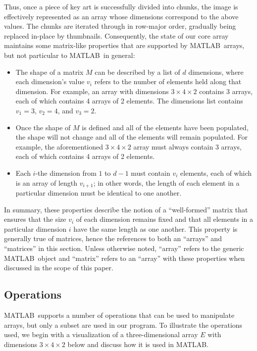 \documentclass[11pt,conference]{IEEEtran}
\newcommand{\matlab}{MATLAB}
\theoremstyle{plain} %
\theoremstyle{definition}
\theoremstyle{remark}
\begin{document}
Thus, once a piece of key art is successfully divided into chunks, the image is
effectively represented as an array whose dimensions correspond to the above
values. The chunks are iterated through in row-major order, gradually being
replaced in-place by thumbnails. Consequently, the state of our core array
maintains some matrix-like properties that are supported by \matlab\ arrays,
but not particular to \matlab\ in general:

\begin{itemize}
    \item The shape of a matrix \(M\) can be described by a list of \(d\)
        dimensions, where each dimension's value \(v_i\) refers to the number of
        elements held along that dimension. For example, an array with
        dimensions \(3 \times 4 \times 2\) contains 3 arrays, each of which
        contains 4 arrays of 2 elements. The dimensions list contains \(v_1 =
        3\), \(v_2 = 4\), and \(v_3 = 2\).
    \item Once the shape of \(M\) is defined and all of the elements have been
        populated, the shape will not change and all of the elements will remain
        populated. For example, the aforementioned \(3 \times 4 \times 2\) array
        must always contain 3 arrays, each of which contains 4 arrays of 2
        elements.
    \item Each \(i\)-the dimension from \(1\) to \(d-1\) must contain \(v_i\)
        elements, each of which is an array of length \(v_{i+1}\); in other
        words, the length of each element in a particular dimension must be
        identical to one another.
\end{itemize}

In summary, these properties describe the notion of a ``well-formed'' matrix
that ensures that the size \(v_i\) of each dimension remains fixed and that all
elements in a particular dimension \(i\) have the same length as one another.
This property is generally true of matrices, hence the references to both an
``arrays'' and ``matrices'' in this section. Unless otherwise noted, ``array''
refers to the generic \matlab\ object and ``matrix'' refers to an ``array'' with
these properties when discussed in the scope of this paper.

\subsection{Operations}

\matlab\ supports a number of operations that can be used to manipulate arrays,
but only a subset are used in our program. To illustrate the operations used, we
begin with a visualization of a three-dimensional array \(E\) with dimensions
\(3 \times 4 \times 2\) below and discuss how it is used in \matlab.
\end{document}
